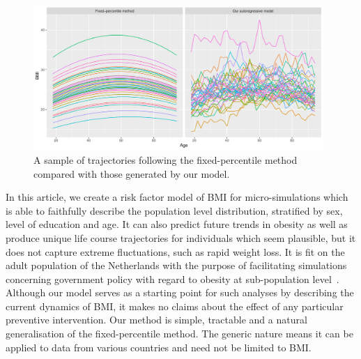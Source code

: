 \documentclass{imammb}
\numberwithin{equation}{section}
\begin{document}
\vspace{-4mm}

\begin{figure}[!h]
\centering
\includegraphics[width=0.98\textwidth] {"Figures/Individual Trajectories.pdf"}
\caption{A sample of trajectories following the fixed-percentile method compared with those generated by our model.}
\label{fig:Individual Trajectories}
\vspace*{-9pt}
\end{figure}

\vspace{2mm}

In this article, we create a risk factor model of BMI for micro-simulations which is able to faithfully describe the population level distribution, stratified by sex, level of education and age. It can also predict future trends in obesity as well as produce unique life course trajectories for individuals which seem plausible, but it does not capture extreme fluctuations, such as rapid weight loss. It is fit on the adult population of the Netherlands with the purpose of facilitating simulations concerning government policy with regard to obesity at sub-population level~\citep{TenDam2023}. Although our model serves as a starting point for such analyses by describing the current dynamics of BMI, it makes no claims about the effect of any particular preventive intervention. Our method is simple, tractable and a natural generalisation of the fixed-percentile method. The generic nature means it can be applied to data from various countries and need not be limited to BMI.
\end{document}
